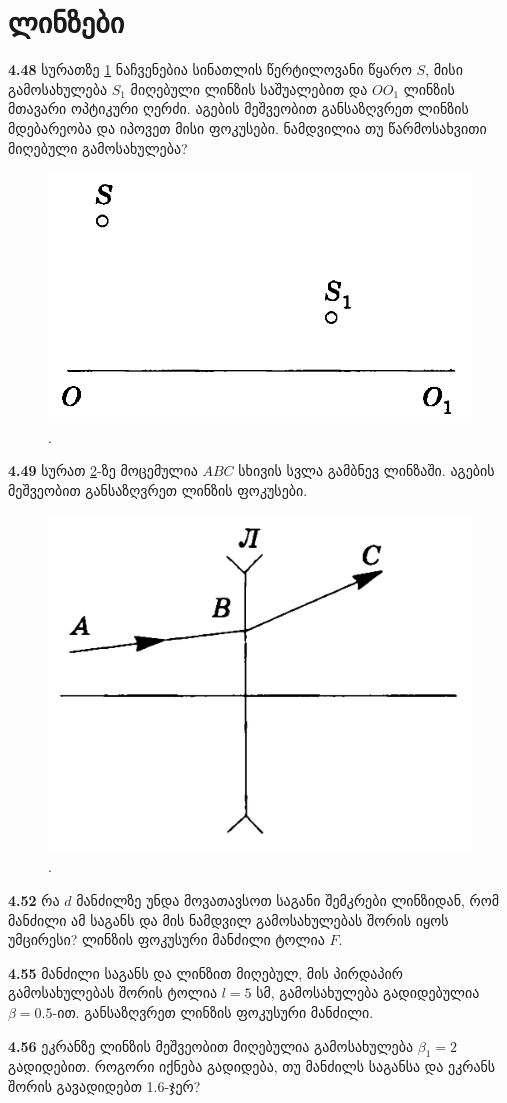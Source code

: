\documentclass[a4paper]{book}
\begin{document}
\section{ლინზები}

\textbf{4.48} სურათზე \ref{fig:4_48} ნაჩვენებია სინათლის წერტილოვანი წყარო $S$, მისი გამოსახულება $S_1$ მიღებული ლინზის საშუალებით და $OO_1$ ლინზის მთავარი ოპტიკური ღერძი. აგების მეშვეობით განსაზღვრეთ ლინზის მდებარეობა და იპოვეთ მისი ფოკუსები. ნამდვილია თუ წარმოსახვითი მიღებული გამოსახულება?
	\begin{figure}[h]
		   \centering
           \includegraphics[width=0.4\columnwidth]{figures/4_48}
           \caption{.}
           \label{fig:4_48}
        \end{figure}

\textbf{4.49} სურათ \ref{fig:4_49}-ზე მოცემულია $ABC$ სხივის სვლა გამბნევ ლინზაში. აგების მეშვეობით განსაზღვრეთ ლინზის ფოკუსები. 
	\begin{figure}[h]
		   \centering
           \includegraphics[width=0.4\columnwidth]{figures/4_49}
           \caption{.}
           \label{fig:4_49}
        \end{figure}

\textbf{4.52} რა $d$ მანძილზე უნდა მოვათავსოთ საგანი შემკრები ლინზიდან, რომ მანძილი ამ საგანს და მის ნამდვილ გამოსახულებას შორის იყოს უმცირესი? ლინზის ფოკუსური მანძილი ტოლია $F$.

\textbf{4.55} მანძილი საგანს და ლინზით მიღებულ, მის პირდაპირ გამოსახულებას შორის ტოლია $l = 5$ სმ, გამოსახულება გადიდებულია $\beta = 0.5$-ით. განსაზღვრეთ ლინზის ფოკუსური მანძილი.

\textbf{4.56} ეკრანზე ლინზის მეშვეობით მიღებულია გამოსახულება $\beta_1 = 2$ გადიდებით. როგორი იქნება გადიდება, თუ მანძილს საგანსა და ეკრანს შორის გავადიდებთ 1.6-ჯერ?
\end{document}
